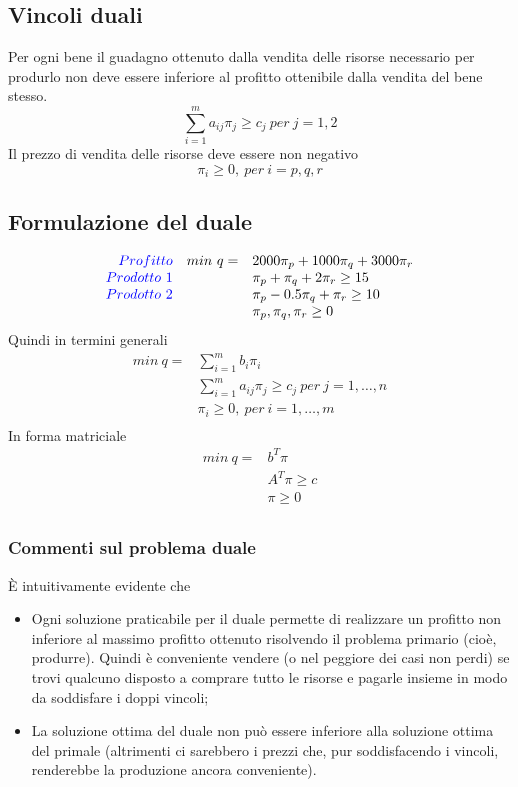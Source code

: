\documentclass[12pt,a4paper]{article}
\begin{document}
\subsection{Vincoli duali}
Per ogni bene il guadagno ottenuto dalla vendita delle risorse necessario per produrlo non deve essere inferiore al profitto ottenibile dalla vendita del bene stesso.
$$\sum_{i=1}^m a_{ij}\pi_j \geq c_j \ per \ j=1,2$$
Il prezzo di vendita delle risorse deve essere non negativo
$$\pi_i \geq 0, \ per\ i=p,q,r$$

\subsection{Formulazione del duale}
$$\begin{array}{rrl}\textcolor{blue}{Profitto} & min \ q = & 2000\pi_p + 1000 \pi_q + 3000\pi_r\\
\textcolor{blue}{Prodotto\ 1} & & \pi_p+\pi_q+2\pi_r \geq 15\\
\textcolor{blue}{Prodotto\ 2} & & \pi_p-0.5\pi_q+\pi_r \geq 10\\
& & \pi_p,\pi_q,\pi_r \geq 0\\
\end{array}$$
Quindi in termini generali 
$$\begin{array}{rl}min \ q = & \sum_{i=1}^m b_i\pi_i\\
 & \sum_{i=1}^ma_{ij}\pi_j \geq c_j \ per\ j=1,\dots,n\\
 & \pi_i \geq 0, \ per \ i=1,\dots, m\\
\end{array}$$
In forma matriciale
$$\begin{array}{rl}min \ q = & b^T\pi\\
 & A^T\pi \geq c\\
 & \pi \geq 0\\
\end{array}$$

\subsubsection{Commenti sul problema duale}
È intuitivamente evidente che
\begin{itemize}
\item Ogni soluzione praticabile per il duale permette di realizzare un profitto non inferiore al massimo profitto ottenuto risolvendo il problema primario (cioè, produrre). Quindi è conveniente vendere (o nel peggiore dei casi non perdi) se trovi qualcuno disposto a comprare tutto le risorse e pagarle insieme in modo da soddisfare i doppi vincoli;
\item La soluzione ottima del duale non può essere inferiore alla soluzione ottima del primale (altrimenti ci sarebbero i prezzi
che, pur soddisfacendo i vincoli, renderebbe la produzione ancora conveniente).
\end{itemize}
\end{document}
